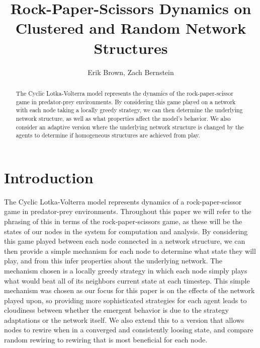 \documentclass[letterpaper, 12 pt, conference]{ieeeconf}
\title{\Huge \bf Rock-Paper-Scissors Dynamics on \\
Clustered and Random Network Structures}
\author{\huge Erik Brown, Zach Bernstein}
\begin{document}
\maketitle
\begin{abstract}
The Cyclic Lotka-Volterra model represents the dynamics of the rock-paper-scissor game in predator-prey environments. By considering this game played on a network with each node taking a locally greedy strategy, we can then determine the underlying network structure, as well as what properties affect the model's behavior. We also consider an adaptive version where the underlying network structure is changed by the agents to determine if homogeneous structures are achieved from play.
\end{abstract}
\section*{Introduction}
The Cyclic Lotka-Volterra model represents dynamics of a rock-paper-scissor game in predator-prey environments. Throughout this paper we will refer to the phrasing of this in terms of the rock-paper-scissors game, as these will be the states of our nodes in the system for computation and analysis. By considering this game played between each node connected in a network structure, we can then provide a simple mechanism for each node to determine what state they will play, and from this infer properties about the underlying network. 
The mechanism chosen is a locally greedy strategy in which each node simply plays what would beat all of its neighbors current state at each timestep. This simple mechanism was chosen as our focus for this paper is on the effects of the network played upon, so providing more sophisticated strategies for each agent leads to cloudiness between whether the emergent behavior is due to the strategy adaptations or the network itself. We also extend this to a version that allows nodes to rewire when in a converged and consistently loosing state, and compare random rewiring to rewiring that is most beneficial for each node.
\newpage
\end{document}
